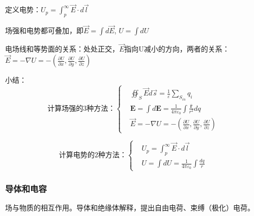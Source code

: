 定义电势：$U_p = \int _p ^ \infty \vec{E} \cdot d \vec{l} $

场强和电势都可叠加，即$\vec{E} = \int d \vec{E}$, $U = \int dU$

电场线和等势面的关系：处处正交，$\vec{E}$指向U减小的方向，两者的关系：$\vec{E} = -\nabla U = - (\frac{\partial U }{\partial x},\frac{\partial U }{\partial y},\frac{\partial U }{\partial z})$





小结：
\begin{equation}
    \mbox{计算场强的3种方法：}
    \left\{ 
        \begin{aligned}
            &\oiint _S  \vec{E}d \vec{s}  = \frac{1}{\varepsilon} \sum_{S_{in}} q_i\\
            &\boldsymbol E =  \int d \boldsymbol E
            = \frac{1}{4 \pi \varepsilon _0} \int \frac{\boldsymbol {\hat{r} } }{r^2} dq\\
            &\vec{E} = -\nabla U = - (\frac{\partial U }{\partial x},\frac{\partial U }{\partial y},\frac{\partial U }{\partial z})
        \end{aligned}
    \right.
\end{equation}

\begin{equation}
    \mbox{计算电势的2种方法：}
    \left\{ 
        \begin{aligned}
            &U_p = \int _p ^ \infty \vec{E} \cdot d \vec{l}\\
            &U = \int dU = \frac{1}{4 \pi \varepsilon _0} \int \frac{dq}{r}
        \end{aligned}
    \right.
\end{equation}


\subsubsection{导体和电容}

场与物质的相互作用。导体和绝缘体解释，提出自由电荷、束缚（极化）电荷。



